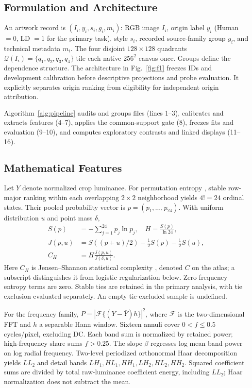 \documentclass[journal,twoside,web]{IEEEtran}
\begin{document}
\subsection{Formulation and Architecture}
An artwork record is $(I_i,y_i,s_i,g_i,m_i)$: RGB image $I_i$, origin label $y_i$ (Human $=0$, LD $=1$ for the primary task), style $s_i$, recorded source-family group $g_i$, and technical metadata $m_i$. The four disjoint $128\times128$ quadrants $\mathcal Q(I_i)=\{q_1,q_2,q_3,q_4\}$ tile each native-$256^2$ canvas once. Groups define the dependence structure. The architecture in Fig.~\ref{fig:f1} freezes IDs and development calibration before descriptive projections and probe evaluation. It explicitly separates origin ranking from eligibility for independent origin attribution.


Algorithm~\ref{alg:pipeline} audits and groups files (lines 1--3), calibrates and extracts features (4--7), applies the common-support gate (8), freezes fits and evaluation (9--10), and computes exploratory contrasts and linked displays (11--16).

\subsection{Mathematical Features}
Let $Y$ denote normalized crop luminance. For permutation entropy \cite{bandt}, stable row-major ranking within each overlapping $2\times2$ neighborhood yields $4!=24$ ordinal states. Their pooled probability vector is $p=(p_1,\ldots,p_{24})$. With uniform distribution $u$ and point mass $\delta$,
\begin{align}
 S(p)&=-\sum_{j=1}^{24}p_j\ln p_j,\quad H=\frac{S(p)}{\ln24},\\
 J(p,u)&=S((p+u)/2)-\tfrac12 S(p)-\tfrac12 S(u),\\
 C_{\!H}&=H\frac{J(p,u)}{J(\delta,u)}.
\end{align}
Here $C_H$ is Jensen--Shannon statistical complexity \cite{rosso}, denoted $C$ on the atlas; a subscript distinguishes it from logistic regularization below. Zero-frequency entropy terms are zero. Stable ties are retained in the primary analysis, with tie exclusion evaluated separately. An empty tie-excluded sample is undefined.

For the frequency family, $P=|\mathcal F\{(Y-\bar Y)h\}|^2$, where $\mathcal F$ is the two-dimensional FFT and $h$ a separable Hann window. Sixteen annuli cover $0<f\leq0.5$ cycles/pixel, excluding DC. Each band sum is normalized by retained power; high-frequency share sums $f>0.25$. The slope $\beta$ regresses log mean band power on log radial frequency. Two-level periodized orthonormal Haar decomposition \cite{imaging,wavelet} yields $LL_2$ and detail bands $LH_1,HL_1,HH_1,LH_2,HL_2,HH_2$. Squared coefficient sums are divided by total raw-luminance coefficient energy, including $LL_2$; Haar normalization does not subtract the mean.
\end{document}
